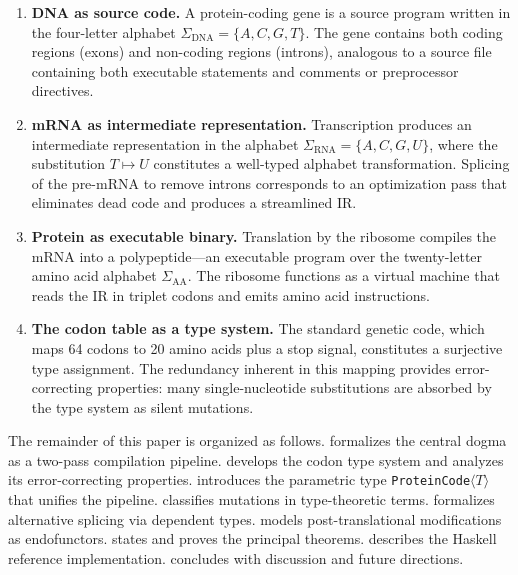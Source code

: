 \documentclass[12pt,a4paper]{article}
\theoremstyle{definition}
\newcommand{\ProteinCode}{\texttt{ProteinCode}\ensuremath{\langle T \rangle}}
\begin{document}
\begin{enumerate}[label=(\roman*)]
  \item \textbf{DNA as source code.} A protein-coding gene is a source program written in the four-letter alphabet $\Sigma_\text{DNA} = \{A, C, G, T\}$. The gene contains both coding regions (exons) and non-coding regions (introns), analogous to a source file containing both executable statements and comments or preprocessor directives.

  \item \textbf{mRNA as intermediate representation.} Transcription produces an intermediate representation in the alphabet $\Sigma_\text{RNA} = \{A, C, G, U\}$, where the substitution $T \mapsto U$ constitutes a well-typed alphabet transformation. Splicing of the pre-mRNA to remove introns corresponds to an optimization pass that eliminates dead code and produces a streamlined IR.

  \item \textbf{Protein as executable binary.} Translation by the ribosome compiles the mRNA into a polypeptide---an executable program over the twenty-letter amino acid alphabet $\Sigma_\text{AA}$. The ribosome functions as a virtual machine that reads the IR in triplet codons and emits amino acid instructions.

  \item \textbf{The codon table as a type system.} The standard genetic code, which maps 64 codons to 20 amino acids plus a stop signal, constitutes a surjective type assignment. The redundancy inherent in this mapping provides error-correcting properties: many single-nucleotide substitutions are absorbed by the type system as silent mutations.
\end{enumerate}

The remainder of this paper is organized as follows.
 formalizes the central dogma as a two-pass compilation pipeline.
 develops the codon type system and analyzes its error-correcting properties.
 introduces the parametric type \ProteinCode{} that unifies the pipeline.
 classifies mutations in type-theoretic terms.
 formalizes alternative splicing via dependent types.
 models post-translational modifications as endofunctors.
 states and proves the principal theorems.
 describes the Haskell reference implementation.
 concludes with discussion and future directions.
\end{document}

